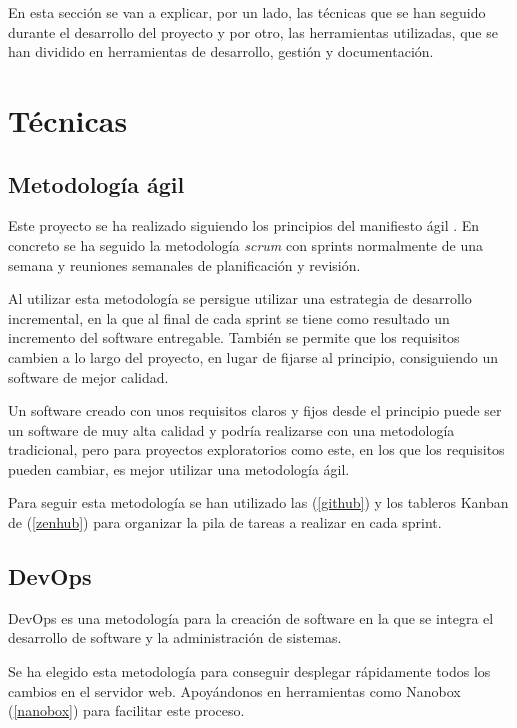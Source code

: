 
En esta sección se van a explicar, por un lado, las técnicas que se han seguido durante el desarrollo del proyecto y por otro, las herramientas utilizadas, que se han dividido en herramientas de desarrollo, gestión y documentación.

\section{Técnicas}

\subsection{Metodología ágil}

Este proyecto se ha realizado siguiendo los principios del manifiesto ágil \cite{art:agilemanifesto}. En concreto se ha seguido la metodología \textit{scrum} \cite{book:scrum} con sprints normalmente de una semana y reuniones semanales de planificación y revisión.

Al utilizar esta metodología se persigue utilizar una estrategia de desarrollo incremental, en la que al final de cada sprint se tiene como resultado un incremento del software entregable. También se permite que los requisitos cambien a lo largo del proyecto, en lugar de fijarse al principio, consiguiendo un software de mejor calidad.

Un software creado con unos requisitos claros y fijos desde el principio puede ser un software de muy alta calidad y podría realizarse con una metodología tradicional, pero para proyectos exploratorios como este, en los que los requisitos pueden cambiar, es mejor utilizar una metodología ágil.

Para seguir esta metodología se han utilizado las  (\ref{github}) y los tableros Kanban de  (\ref{zenhub}) para organizar la pila de tareas a realizar en cada sprint.

\subsection{DevOps}

DevOps \cite{misc:devops} es una metodología para la creación de software en la que se integra el desarrollo de software y la administración de sistemas.

Se ha elegido esta metodología para conseguir desplegar rápidamente todos los cambios en el servidor web. Apoyándonos en herramientas como Nanobox (\ref{nanobox}) para facilitar este proceso.

